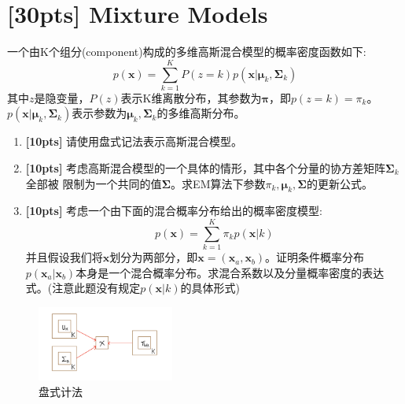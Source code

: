 \documentclass[a4paper,UTF8]{article}
\numberwithin{equation}{section}
\begin{document}
\section{\textbf{[30pts]} Mixture Models}
一个由K个组分(component)构成的多维高斯混合模型的概率密度函数如下:
\begin{equation}
    p\left(\boldsymbol{x}\right) = \sum_{k=1}^{K} P\left(z=k\right) p\left(\boldsymbol{x}|\boldsymbol{\mu}_k,\boldsymbol{\Sigma}_k\right)
\end{equation}
其中$z$是隐变量，$P(z)$表示K维离散分布，其参数为$\boldsymbol{\pi}$，即$p\left(z=k\right) = \pi_k$。$p\left(\boldsymbol{x}|\boldsymbol{\mu}_k,\boldsymbol{\Sigma}_k\right)$表示参数为$\boldsymbol{\mu}_k,\boldsymbol{\Sigma}_k$的多维高斯分布。
\begin{enumerate}
    \item  \textbf{[10pts]} 请使用盘式记法表示高斯混合模型。
    \item \textbf{[10pts]} 考虑高斯混合模型的一个具体的情形，其中各个分量的协方差矩阵$\boldsymbol{\Sigma}_k$全部被
限制为一个共同的值$\boldsymbol{\Sigma}$。求EM算法下参数$\pi_k,\boldsymbol{\mu}_k,\boldsymbol{\Sigma}$的更新公式。
\item \textbf{[10pts]} 考虑一个由下面的混合概率分布给出的概率密度模型:
\begin{equation}
    p\left(\boldsymbol{x}\right) = \sum_{k=1}^{K} \pi_k p\left(\boldsymbol{x}| k\right)
\end{equation}
并且假设我们将$\boldsymbol{x}$划分为两部分，即$\boldsymbol{x} = \left(\boldsymbol{x}_a,\boldsymbol{x}_b\right)$。证明条件概率分布$p\left(\boldsymbol{x}_a|\boldsymbol{x}_b\right)$本身是一个混合概率分布。求混合系数以及分量概率密度的表达式。(注意此题没有规定$p\left(\boldsymbol{x}|k\right)$的具体形式)
\end{enumerate}
\begin{figure}[!htb]
		\centering
		\includegraphics[width=0.4\textwidth]{plate.png}
		\caption{盘式计法}
		\label{fig:1}
\end{figure}
\end{document}
